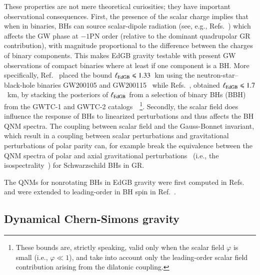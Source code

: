 \documentclass[twocolumn,
               prd,
               aps,
               superscriptaddress,
               tightenlines,
               nofootinbib,
               eqsecnum,
               amsfonts,
               amsmath,
               longbibliography]{revtex4-1}
\begin{document}
These properties are not mere theoretical curiosities; they have important observational consequences.
%
First, the presence of the scalar charge implies that when in binaries, BHs can source
scalar-dipole radiation (see, e.g., Refs.~\cite{Yagi:2011xp,Julie:2019sab,Shiralilou:2020gah,Shiralilou:2021mfl,Julie:2022huo})
which affects the GW phase at $-1$PN order (relative to the dominant quadrupolar GR
contribution), with magnitude proportional to the difference between the
charges of binary components. This makes EdGB gravity testable with present GW
observations of compact binaries where at least if one component is a BH.
%
More specifically, Ref.~\cite{Lyu:2022gdr} placed the bound
%
$\ell_{\rm EdGB} \leqslant 1.33$~km
%
using the neutron-star--black-hole binaries GW200105 and
GW200115~\cite{LIGOScientific:2021qlt} while Refs.~\cite{Nair:2019iur,Perkins:2021mhb}, obtained
%
$\ell_{\rm EdGB} \leqslant 1.7$~km,
%
by stacking the posteriors of $\ell_{\rm EdGB}$ from a selection of binary BHs (BBH)
from the GWTC-1 and GWTC-2 catalogs~\cite{LIGOScientific:2018mvr,LIGOScientific:2020ibl}~\footnote{These bounds
are, strictly speaking, valid only when the scalar field $\varphi$ is small (i.e., $\varphi \ll 1$), and
take into account only the leading-order scalar field contribution arising from the dilatonic coupling.}.
Secondly, the scalar field does influence the response of BHs to linearized perturbations and thus
affects the BH QNM spectra.
%
The coupling between scalar field and the Gauss-Bonnet invariant, which
result in a coupling between scalar perturbations and gravitational
perturbations of polar parity can, for example break the equivalence
between the QNM spectra of polar and axial gravitational perturbations~\cite{Glampedakis:2017rar,Lenzi:2021njy}
(i.e., the isospectrality~\cite{Chandrasekhar:1985kt}) for Schwarzschild BHs in GR.
%

The QNMs for nonrotating BHs in EdGB gravity were first computed in
Refs.~\cite{Pani:2009wy,Blazquez-Salcedo:2016enn} and were
extended to leading-order in BH spin in Ref.~\cite{Pierini:2021jxd}.

\subsection{Dynamical Chern-Simons gravity}
\label{sec:review_dcs}
\end{document}
